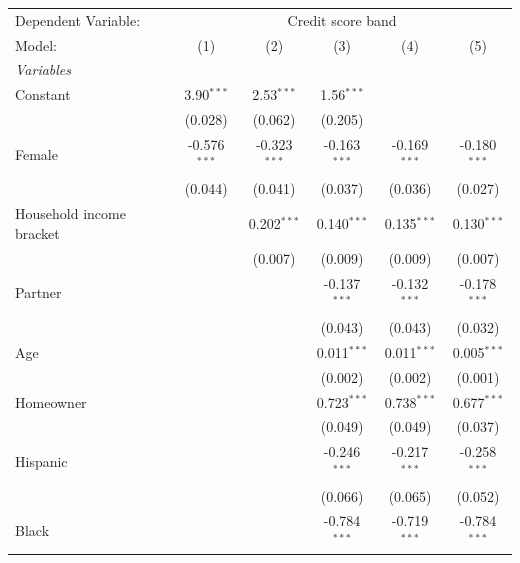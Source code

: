 
\begingroup
\centering
\begin{tabular}{lccccc}
   \tabularnewline \midrule \midrule
   Dependent Variable: & \multicolumn{5}{c}{Credit score band}\\
   Model:                   & (1)            & (2)            & (3)            & (4)            & (5)\\  
   \midrule
   \emph{Variables}\\
   Constant                 & 3.90$^{***}$   & 2.53$^{***}$   & 1.56$^{***}$   &                &   \\   
                            & (0.028)        & (0.062)        & (0.205)        &                &   \\   
   Female                   & -0.576$^{***}$ & -0.323$^{***}$ & -0.163$^{***}$ & -0.169$^{***}$ & -0.180$^{***}$\\   
                            & (0.044)        & (0.041)        & (0.037)        & (0.036)        & (0.027)\\   
   Household income bracket &                & 0.202$^{***}$  & 0.140$^{***}$  & 0.135$^{***}$  & 0.130$^{***}$\\   
                            &                & (0.007)        & (0.009)        & (0.009)        & (0.007)\\   
   Partner                  &                &                & -0.137$^{***}$ & -0.132$^{***}$ & -0.178$^{***}$\\   
                            &                &                & (0.043)        & (0.043)        & (0.032)\\   
   Age                      &                &                & 0.011$^{***}$  & 0.011$^{***}$  & 0.005$^{***}$\\   
                            &                &                & (0.002)        & (0.002)        & (0.001)\\   
   Homeowner                &                &                & 0.723$^{***}$  & 0.738$^{***}$  & 0.677$^{***}$\\   
                            &                &                & (0.049)        & (0.049)        & (0.037)\\   
   Hispanic                 &                &                & -0.246$^{***}$ & -0.217$^{***}$ & -0.258$^{***}$\\   
                            &                &                & (0.066)        & (0.065)        & (0.052)\\   
   Black                    &                &                & -0.784$^{***}$ & -0.719$^{***}$ & -0.784$^{***}$\\   

\end{tabular}
